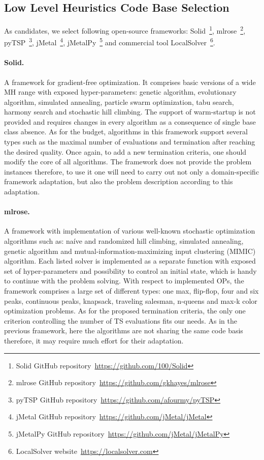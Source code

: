 \subsection{Low Level Heuristics Code Base Selection}\label{implementation:llh code basis selection}
As candidates, we select following open-source frameworks: Solid~\footnote{Solid GitHub repository~\url{https://github.com/100/Solid}}, mlrose~\footnote{mlrose GitHub repository~\url{https://github.com/gkhayes/mlrose}}, pyTSP~\footnote{pyTSP GitHub repository~\url{https://github.com/afourmy/pyTSP}}, jMetal~\footnote{jMetal GitHub repository~\url{https://github.com/jMetal/jMetal}}, jMetalPy~\footnote{jMetalPy GitHub repository~\url{https://github.com/jMetal/jMetalPy}} and commercial tool LocalSolver~\footnote{LocalSolver website~\url{https://localsolver.com}}.

\paragraph{Solid.} A framework for gradient-free optimization. It comprises basic versions of a wide MH range with exposed hyper-parameters: genetic algorithm, evolutionary algorithm, simulated annealing, particle swarm optimization, tabu search, harmony search and stochastic hill climbing. The support of warm-startup is not provided and requires changes in every algorithm as a consequence of single base class absence. As for the budget, algorithms in this framework support several types such as the maximal number of evaluations and termination after reaching the desired quality. Once again, to add a new termination criteria, one should modify the core of all algorithms. The framework does not provide the problem instances therefore, to use it one will need to carry out not only a domain-specific framework adaptation, but also the problem description according to this adaptation.

\paragraph{mlrose.} A framework with implementation of various well-known stochastic optimization algorithms such as: na\'ive and randomized hill climbing, simulated annealing, genetic algorithm and mutual-information-maximizing input clustering (MIMIC) algorithm. Each listed solver is implemented as a separate function with exposed set of hyper-parameters and possibility to control an initial state, which is handy to continue with the problem solving. With respect to implemented OPs, the framework comprises a large set of different types: one max, flip-flop, four and six peaks, continuous peaks, knapsack, traveling salesman, n-queens and max-k color optimization problems. As for the proposed termination criteria, the only one criterion controlling the number of TS evaluations fits our needs. As in the previous framework, here the algorithms are not sharing the same code basis therefore, it may require much effort for their adaptation.

